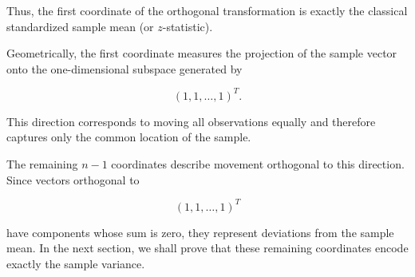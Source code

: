 \documentclass[11pt]{article}
\begin{document}
\begin{mdframed}[
		linewidth=0.8pt,
		roundcorner=6pt,
		backgroundcolor=gray!5,
		linecolor=gray!60,
		innertopmargin=10pt,
		innerbottommargin=10pt,
		innerleftmargin=10pt,
		innerrightmargin=10pt
		]
		Thus, the first coordinate of the orthogonal transformation is exactly the
		classical standardized sample mean (or $z$-statistic).
		
		Geometrically, the first coordinate measures the projection of the sample
		vector onto the one-dimensional subspace generated by
		
		\[
		(1,1,\ldots,1)^T.
		\]
		
		This direction corresponds to moving all observations equally and therefore
		captures only the common location of the sample.
		
		The remaining $n-1$ coordinates describe movement orthogonal to this
		direction. Since vectors orthogonal to
		
		\[
		(1,1,\ldots,1)^T
		\]
		
		have components whose sum is zero, they represent deviations from the
		sample mean. In the next section, we shall prove that these remaining
		coordinates encode exactly the sample variance.
		
	\end{mdframed}
	
\end{document}
